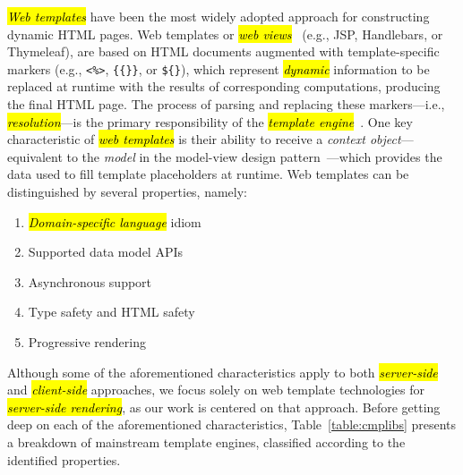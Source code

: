 \documentclass[software,article,accept,pdftex,moreauthors]{Definitions/mdpi}
\begin{document}
\textit{\hl{Web templates}} have been the most widely adopted approach for
constructing dynamic HTML pages.
Web templates or \textit{\hl{web views}}~\cite{Fowler02,Alur01} (e.g., JSP, Handlebars,
or Thymeleaf), are based on HTML documents augmented with template-specific
markers (e.g., \texttt{<\%>}, \texttt{\{\{\}\}}, or \texttt{\$\{\}}), which
represent \textit{\hl{dynamic}} information to be replaced at runtime with the
results of corresponding computations, producing the final HTML page.
The process of parsing and replacing these markers---i.e.,
\textit{\hl{resolution}}---is the primary responsibility of the \textit{\hl{template
  engine}}~\cite{Parr04}.
One key characteristic of \textit{\hl{web templates}} is their ability to receive a
\textit{context object}---equivalent to the \textit{model} in the model-view
design pattern~\cite{mvc88,Parr04}---which provides the data used to fill
template placeholders at runtime.
Web templates can be distinguished by several properties, namely:
\begin{enumerate}
  \item \textit{\hl{Domain-specific language}} idiom
  \item Supported data model APIs
  \item Asynchronous support
  \item Type safety and HTML safety
  \item Progressive rendering
\end{enumerate}

Although some of the aforementioned characteristics apply to both
\textit{\hl{server-side}} and \textit{\hl{client-side}} approaches, we focus solely on
web template technologies for \textit{\hl{server-side rendering}}, as our work is
centered on that approach. Before getting deep on each of the aforementioned
characteristics, Table~\ref{table:cmplibs} presents a breakdown of mainstream
template engines, classified according to the identified properties.
\end{document}
